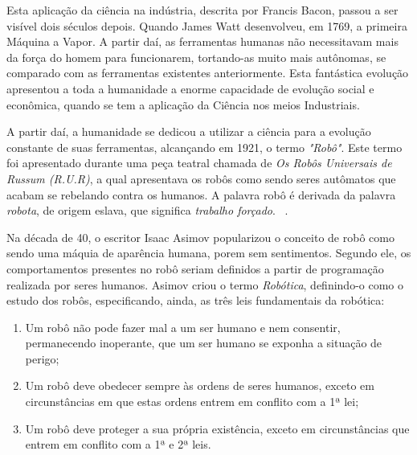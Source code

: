 	Esta aplicação da ciência na indústria, descrita por Francis Bacon, passou a ser visível dois séculos depois. Quando James Watt desenvolveu, em 1769, a primeira Máquina a Vapor. A partir daí, as ferramentas humanas não necessitavam mais da força do homem para funcionarem, tortando-as muito mais autônomas, se comparado com as ferramentas existentes anteriormente. Esta fantástica evolução apresentou a toda a humanidade a enorme capacidade de evolução social e econômica, quando se tem a aplicação da Ciência nos meios Industriais.

	A partir daí, a humanidade se dedicou a utilizar a ciência para a evolução constante de suas ferramentas, alcançando em 1921, o termo \textit{"Robô"}. Este termo foi apresentado durante uma peça teatral chamada de \textit{Os Robôs Universais de Russum (R.U.R)}, a qual apresentava os robôs como sendo seres autômatos que acabam se rebelando contra os humanos. A palavra robô é derivada da palavra \textit{robota}, de origem eslava, que significa \textit{trabalho forçado}. ~\cite{roboticaIndustrial}.

	Na década de 40, o escritor Isaac Asimov popularizou o conceito de robô como sendo uma máquia de aparência humana, porem sem sentimentos. Segundo ele, os comportamentos presentes no robô seriam definidos a partir de programação realizada por seres humanos. Asimov criou o termo \textit{Robótica}, definindo-o como o estudo dos robôs, especificando, ainda, as três leis fundamentais da robótica:

	\begin{enumerate}
		\item Um robô não pode fazer mal a um ser humano e nem consentir, permanecendo inoperante,
 que um ser humano se exponha a situação de perigo; 
 		\item Um robô deve obedecer sempre às ordens de seres humanos, exceto em circunstâncias em
 que estas ordens entrem em conflito com a 1ª lei; 
 		\item Um robô deve proteger a sua própria existência, exceto em circunstâncias que entrem em
 conflito com a 1ª e 2ª leis.
	\end{enumerate}

